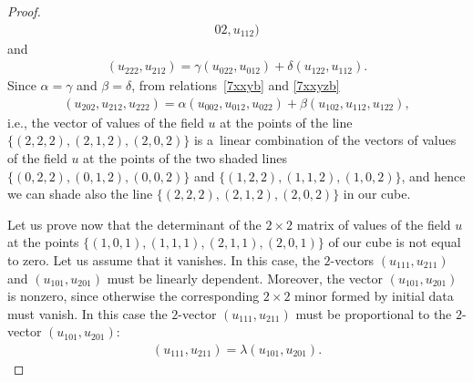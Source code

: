 \begin{proof}
\begin{gather}
{0 2}, u_{1 1 2}) \label{7xxyb} \end{gather} and
\begin{gather} (u_{2 2 2}, u_{2 1 2}) =
\gamma (u_{0 2 2}, u_{0 1 2}) + \delta (u_{1 2 2}, u_{1 1 2}).
\label{7xxyzb}
\end{gather}
Since $\alpha = \gamma$ and $\beta = \delta$,
from relations~\eqref{7xxyb} and \eqref{7xxyzb}
\begin{gather*} (u_{2 0 2}, u_{2
1 2}, u_{2 2 2}) = \alpha (u_{0 0 2}, u_{0 1 2}, u_{0 2 2}) + \beta
(u_{1 0 2}, u_{1 1 2}, u_{1 2 2}), %
\end{gather*} i.e., the
vector of values of the f\/ield $u$ at the points of the line $\{(2,
2, 2), (2, 1, 2), (2, 0, 2)\}$ is a~linear combination of the
vectors of values of the f\/ield $u$ at the points of the two shaded
lines $\{(0, 2, 2), (0, 1, 2), (0, 0, 2)\}$ and $\{(1, 2, 2), (1, 1,
2), (1, 0, 2)\}$, and hence we can shade also the line $\{(2, 2, 2),
(2, 1, 2), (2, 0, 2)\}$ in our cube.


Let us prove now that the determinant of the $2 \times 2$ matrix of
values of the f\/ield $u$ at the points $\{(1, 0, 1), (1, 1, 1), (2,
1, 1), (2, 0, 1)\}$ of our cube is not equal to zero. Let us assume
that it vanishes. In this case, the $2$-vectors $(u_{1 1 1}, u_{2 1
1})$ and $(u_{1 0 1}, u_{2 0 1})$ must be linearly dependent.
Moreover, the vector $(u_{1 0 1}, u_{2 0 1})$ is nonzero, since
otherwise the corresponding $2 \times 2$ minor formed by initial
data must vanish. In this case the $2$-vector $(u_{1 1 1}, u_{2 1
1})$ must be proportional to the $2$-vector $(u_{1 0 1}, u_{2 0
1})$: \begin{gather} (u_{1 1 1}, u_{2 1 1}) = \lambda (u_{1 0 1}, u_{2 0 1}).
\label{6xxb} \end{gather}



\end{proof}
